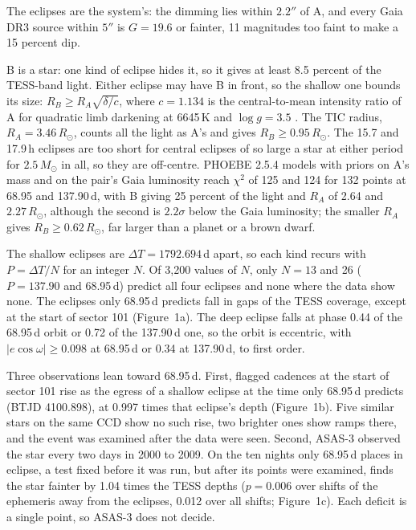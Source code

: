 \documentclass[RNAAS]{aastex631}
\begin{document}
The eclipses are the system's: the dimming lies within $2.2''$ of A, and every Gaia DR3 source within $5''$ is $G=19.6$ or fainter, 11 magnitudes too faint to make a 15 percent dip.

B is a star: one kind of eclipse hides it, so it gives at least 8.5 percent of the TESS-band light. Either eclipse may have B in front, so the shallow one bounds its size: $R_B\geq R_A\sqrt{\delta/c}$, where $c=1.134$ is the central-to-mean intensity ratio of A for quadratic limb darkening at 6645\,K and $\log g=3.5$ \citep{Claret2017}. The TIC radius, $R_A=3.46\,R_\odot$, counts all the light as A's and gives $R_B\geq0.95\,R_\odot$. The 15.7 and 17.9\,h eclipses are too short for central eclipses of so large a star at either period for $2.5\,M_\odot$ in all, so they are off-centre. PHOEBE 2.5.4 models \citep{Conroy2020} with priors on A's mass and on the pair's Gaia luminosity reach $\chi^2$ of 125 and 124 for 132 points at 68.95 and 137.90\,d, with B giving 25 percent of the light and $R_A$ of 2.64 and $2.27\,R_\odot$, although the second is $2.2\sigma$ below the Gaia luminosity; the smaller $R_A$ gives $R_B\geq0.62\,R_\odot$, far larger than a planet or a brown dwarf.

The shallow eclipses are $\Delta T=1792.694$\,d apart, so each kind recurs with $P=\Delta T/N$ for an integer $N$. Of 3,200 values of $N$, only $N=13$ and 26 ($P=137.90$ and 68.95\,d) predict all four eclipses and none where the data show none. The eclipses only 68.95\,d predicts fall in gaps of the TESS coverage, except at the start of sector 101 (Figure~1a). The deep eclipse falls at phase 0.44 of the 68.95\,d orbit or 0.72 of the 137.90\,d one, so the orbit is eccentric, with $|e\cos\omega|\geq0.098$ at 68.95\,d or 0.34 at 137.90\,d, to first order.

Three observations lean toward 68.95\,d. First, flagged cadences at the start of sector 101 rise as the egress of a shallow eclipse at the time only 68.95\,d predicts (BTJD 4100.898), at 0.997 times that eclipse's depth (Figure~1b). Five similar stars on the same CCD show no such rise, two brighter ones show ramps there, and the event was examined after the data were seen. Second, ASAS-3 \citep{Pojmanski1997} observed the star every two days in 2000 to 2009. On the ten nights only 68.95\,d places in eclipse, a test fixed before it was run, but after its points were examined, finds the star fainter by 1.04 times the TESS depths ($p=0.006$ over shifts of the ephemeris away from the eclipses, 0.012 over all shifts; Figure~1c). Each deficit is a single point, so ASAS-3 does not decide.
\end{document}
